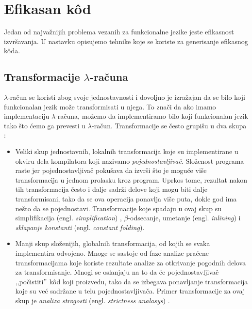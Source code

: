 \section{Efikasan k\^od}
\label{sec:efikasan kod}


Jedan od najvažnijih problema vezanih za funkcionalne jezike jeste efikasnost izvršavanja. 
U nastavku opisujemo tehnike koje se koriste za generisanje efikasnog k\^oda.	


\subsection{Transformacije $\lambda$-računa}

$\lambda$-račun se koristi zbog svoje jednostavnosti i dovoljno je izražajan da se bilo koji funkcionalan jezik može transformisati u njega. To znači da ako imamo implementaciju $\lambda$-računa, možemo da implementiramo  bilo koji funkcionalan jezik tako što ćemo ga prevesti u $\lambda$-račun. Transformacije se često grupišu u dva skupa \cite{compilation-by-program-transformation}:

\begin{itemize}
	\item Veliki skup jednostavnih, lokalnih transformacija koje su implementirane u okviru dela kompilatora koji nazivamo \textit{pojednostavljivač}. Složenost programa raste jer pojednostavljivač pokušava da izvrši što je moguće više transformacija u jednom prolasku kroz program. Uprkos tome, rezultat nakon tih transformacija često i dalje sadrži delove koji mogu biti dalje transformisani, tako da se ova operacija ponavlja više puta, dokle god ima nešto da se pojednostavi. Transformacije koje spadaju u ovaj skup su simplifikacija (engl. \textit{simplification}) \cite{compilation-by-program-transformation}, $\beta$-odsecanje, umetanje (engl. \textit{inlining}) i \textit{sklapanje konstanti} (engl. \textit{constant folding}).
	
	\item Manji skup složenijih, globalnih transformacija, od kojih se svaka implementira odvojeno. Mnoge se sastoje od faze analize praćene transformacijama koje koriste rezultate analize za otkrivanje pogodnih delova za transformisanje. Mnogi se oslanjaju na to da će pojednostavljivač ‚‚počistiti$"$ k\^ od koji proizvedu, tako da se izbegava ponavljanje transformacija koje su već sadržane u telu pojednostavljivača. Primer transformacije za ovaj skup je  \textit{analiza strogosti} (engl. \textit{strictness analasys}) \cite{haskell-by-program-transformation}. 
	
\end{itemize}
  

